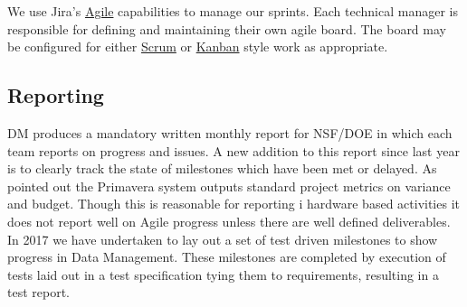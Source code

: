 We use Jira's
\href{https://www.atlassian.com/software/jira/agile}{Agile} capabilities
to manage our sprints. Each technical manager is responsible for
defining and maintaining their own agile board. The board may be
configured for either
\href{https://en.wikipedia.org/wiki/Scrum_(software_development)}{Scrum}
or \href{https://en.wikipedia.org/wiki/Kanban_(development)}{Kanban}
style work as appropriate.

\subsection{Reporting }
DM produces a mandatory written monthly report for NSF/DOE in which each team reports on progress and issues. A new addition to this report since last year is to clearly track the state of milestones which have been met or delayed.
As \cite{2016SPIE.9911E..0NK} pointed out the Primavera system outputs standard project metrics on variance and budget.
Though this is reasonable  for reporting i hardware based activities it does not report well on Agile progress unless there are well defined deliverables.
In 2017 we have undertaken to lay out a set of test driven milestones to show progress in Data Management. These milestones are completed by execution of tests laid out in a test specification tying them to requirements, resulting in a test report.


